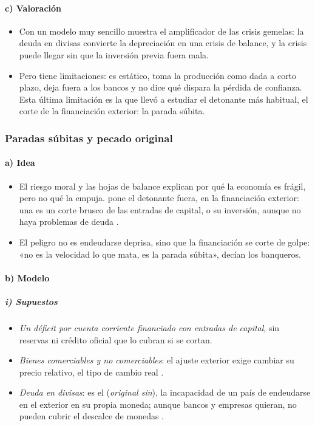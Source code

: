 \documentclass[11pt]{article}
\begin{document}
\paragraph{c) Valoración}

\begin{itemize}
\item Con un modelo muy sencillo muestra el amplificador de las crisis gemelas: la deuda en divisas convierte la depreciación en una crisis de balance, y la crisis puede llegar sin que la inversión previa fuera mala.
\item Pero tiene limitaciones: es estático, toma la producción como dada a corto plazo, deja fuera a los bancos y no dice qué dispara la pérdida de confianza. Esta última limitación es la que llevó a estudiar el detonante más habitual, el corte de la financiación exterior: la parada súbita.
\end{itemize}

\subsubsection{Paradas súbitas y pecado original}\label{sec:paradas-subitas}

\paragraph{a) Idea}

\begin{itemize}
\item El riesgo moral y las hojas de balance explican por qué la economía es frágil, pero no qué la empuja. \textcite{Calvo1998SuddenStops} pone el detonante fuera, en la financiación exterior: una  es un corte brusco de las entradas de capital, o su inversión, aunque no haya problemas de deuda  .
\item El peligro no es endeudarse deprisa, sino que la financiación se corte de golpe: «no es la velocidad lo que mata, es la parada súbita», decían los banqueros\nocite{DornbuschGoldfajnValdes1995Currency}.
\end{itemize}

\paragraph{b) Modelo}

\subparagraph{i) Supuestos}

\begin{itemize}
\item \emph{Un déficit por cuenta corriente financiado con entradas de capital}, sin reservas ni crédito oficial que lo cubran si se cortan.
\item \emph{Bienes comerciables y no comerciables}: el ajuste exterior exige cambiar su precio relativo, el tipo de cambio real .
\item \emph{Deuda en divisas}: es el  (\emph{original sin}), la incapacidad de un país de endeudarse en el exterior en su propia moneda\nocite{EichengreenHausmann1999}; aunque bancos y empresas quieran, no pueden cubrir el descalce de monedas .
\end{itemize}
\end{document}
